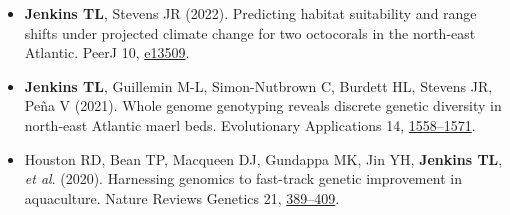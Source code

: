 \documentclass[10pt,a4paper,]{article}
\providecommand{\tightlist}{%
  \setlength{\itemsep}{0pt}\setlength{\parskip}{0pt}}
\begin{document}
\begin{itemize}
\tightlist
\item
  \textbf{Jenkins TL}, Stevens JR (2022). Predicting habitat suitability
  and range shifts under projected climate change for two octocorals in
  the north-east Atlantic. PeerJ 10,
  \href{https://doi.org/https://doi.org/10.7717/peerj.13509}{e13509}.
\item
  \textbf{Jenkins TL}, Guillemin M-L, Simon-Nutbrown C, Burdett HL,
  Stevens JR, Peña V (2021). Whole genome genotyping reveals discrete
  genetic diversity in north‐east Atlantic maerl beds. Evolutionary
  Applications 14,
  \href{https://doi.org/https://doi.org/10.1111/eva.13219}{1558--1571}.
\item
  Houston RD, Bean TP, Macqueen DJ, Gundappa MK, Jin YH, \textbf{Jenkins
  TL}, \emph{et al}. (2020). Harnessing genomics to fast-track genetic
  improvement in aquaculture. Nature Reviews Genetics 21,
  \href{https://doi.org/https://doi.org/10.1038/s41576-020-0227-y}{389--409}.
\end{itemize}
\end{document}

